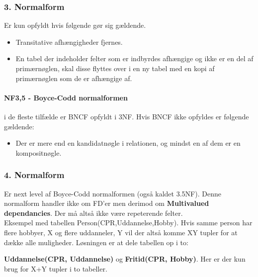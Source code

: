 \subsubsection{3. Normalform} 
Er kun opfyldt hvis følgende gør sig gældende.

\begin{itemize}
	\item Transitative afhængigheder fjernes.
	\item En tabel der indeholder felter som er indbyrdes afhængige og ikke er en del af primærnøglen, skal disse flyttes over i en ny tabel med en kopi af primærnøglen som de er afhængige af.
\end{itemize}
	
\paragraph{NF3,5 - Boyce-Codd normalformen} i de fleste tilfælde er BNCF opfyldt i 3NF. Hvis BNCF ikke opfyldes er følgende gældende:
	
\begin{itemize}
	\item Der er mere end en kandidatnøgle i relationen, og mindst en af dem er en kompositnøgle.
\end{itemize}
	
\subsubsection{4. Normalform}
Er next level af Boyce-Codd normalformen (også kaldet 3.5NF). Denne normalform handler ikke om FD'er men derimod om \textbf{Multivalued dependancies}. Der må altså ikke være repeterende felter.\\

Eksempel med tabellen Person(CPR,Uddannelse,Hobby). Hvis samme person har flere hobbyer, X og flere uddanneler, Y vil der altså komme XY tupler for at dække alle muligheder. Løsningen er at dele tabellen op i to: 

\textbf{Uddannelse(CPR, Uddannelse)} og \textbf{Fritid(CPR, Hobby)}. Her er der kun brug for X+Y tupler i to tabeller.

